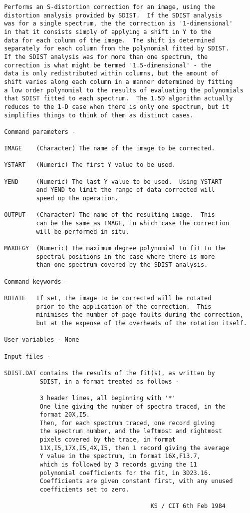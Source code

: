 \begin{description}
\begin{verbatim}
 Performs an S-distortion correction for an image, using the
 distortion analysis provided by SDIST.  If the SDIST analysis
 was for a single spectrum, the the correction is '1-dimensional'
 in that it consists simply of applying a shift in Y to the
 data for each column of the image.  The shift is determined
 separately for each column from the polynomial fitted by SDIST.
 If the SDIST analysis was for more than one spectrum, the
 correction is what might be termed '1.5-dimensional' - the
 data is only redistributed within columns, but the amount of
 shift varies along each column in a manner determined by fitting
 a low order polynomial to the results of evaluating the polynomials
 that SDIST fitted to each spectrum.  The 1.5D algorithm actually
 reduces to the 1-D case when there is only one spectrum, but it
 simplifies things to think of them as distinct cases.

 Command parameters -

 IMAGE    (Character) The name of the image to be corrected.

 YSTART   (Numeric) The first Y value to be used.

 YEND     (Numeric) The last Y value to be used.  Using YSTART
          and YEND to limit the range of data corrected will
          speed up the operation.

 OUTPUT   (Character) The name of the resulting image.  This
          can be the same as IMAGE, in which case the correction
          will be performed in situ.

 MAXDEGY  (Numeric) The maximum degree polynomial to fit to the
          spectral positions in the case where there is more
          than one spectrum covered by the SDIST analysis.

 Command keywords -

 ROTATE   If set, the image to be corrected will be rotated
          prior to the application of the correction.  This
          minimises the number of page faults during the correction,
          but at the expense of the overheads of the rotation itself.

 User variables - None

 Input files -

 SDIST.DAT contains the results of the fit(s), as written by
           SDIST, in a format treated as follows -

           3 header lines, all beginning with '*'
           One line giving the number of spectra traced, in the
           format 20X,I5.
           Then, for each spectrum traced, one record giving
           the spectrum number, and the leftmost and rightmost
           pixels covered by the trace, in format
           11X,I5,17X,I5,4X,I5, then 1 record giving the average
           Y value in the spectrum, in format 16X,F13.7,
           which is followed by 3 records giving the 11
           polynomial coefficients for the fit, in 3D23.16.
           Coefficients are given constant first, with any unused
           coefficients set to zero.

                                          KS / CIT 6th Feb 1984
\end{verbatim}
\end{description}

